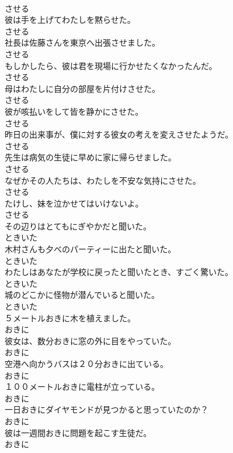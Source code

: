 \documentclass[8pt]{extreport}
\begin{document}
\begin{CJK}{UTF8}{min}
\\	させる
\\	彼は手を上げてわたしを黙らせた。	
\\	させる
\\	社長は佐藤さんを東京へ出張させました。	
\\	させる
\\	もしかしたら、彼は君を現場に行かせたくなかったんだ。	
\\	させる
\\	母はわたしに自分の部屋を片付けさせた。	
\\	させる
\\	彼が咳払いをして皆を静かにさせた。	
\\	させる
\\	昨日の出来事が、僕に対する彼女の考えを変えさせたようだ。	
\\	させる
\\	先生は病気の生徒に早めに家に帰らせました。	
\\	させる
\\	なぜかその人たちは、わたしを不安な気持にさせた。	
\\	させる
\\	たけし、妹を泣かせてはいけないよ。	
\\	させる
\\	その辺りはとてもにぎやかだと聞いた。	
\\	ときいた
\\	木村さんも夕べのパーティーに出たと聞いた。	
\\	ときいた
\\	わたしはあなたが学校に戻ったと聞いたとき、すごく驚いた。	
\\	ときいた
\\	城のどこかに怪物が潜んでいると聞いた。	
\\	ときいた
\\	５メートルおきに木を植えました。	
\\	おきに
\\	彼女は、数分おきに窓の外に目をやっていた。	
\\	おきに
\\	空港へ向かうバスは２０分おきに出ている。	
\\	おきに
\\	１００メートルおきに電柱が立っている。	
\\	おきに
\\	一日おきにダイヤモンドが見つかると思っていたのか？	
\\	おきに
\\	彼は一週間おきに問題を起こす生徒だ。	
\\	おきに

\end{CJK}
\end{document}
